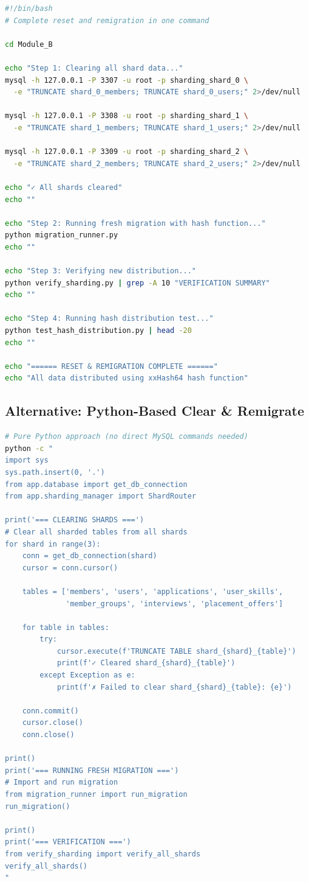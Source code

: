\documentclass[11pt,a4paper]{article}
\begin{document}
\begin{lstlisting}[language=bash]
#!/bin/bash
# Complete reset and remigration in one command

cd Module_B

echo "Step 1: Clearing all shard data..."
mysql -h 127.0.0.1 -P 3307 -u root -p sharding_shard_0 \
  -e "TRUNCATE shard_0_members; TRUNCATE shard_0_users;" 2>/dev/null

mysql -h 127.0.0.1 -P 3308 -u root -p sharding_shard_1 \
  -e "TRUNCATE shard_1_members; TRUNCATE shard_1_users;" 2>/dev/null

mysql -h 127.0.0.1 -P 3309 -u root -p sharding_shard_2 \
  -e "TRUNCATE shard_2_members; TRUNCATE shard_2_users;" 2>/dev/null

echo "✓ All shards cleared"
echo ""

echo "Step 2: Running fresh migration with hash function..."
python migration_runner.py
echo ""

echo "Step 3: Verifying new distribution..."
python verify_sharding.py | grep -A 10 "VERIFICATION SUMMARY"
echo ""

echo "Step 4: Running hash distribution test..."
python test_hash_distribution.py | head -20
echo ""

echo "====== RESET & REMIGRATION COMPLETE ======"
echo "All data distributed using xxHash64 hash function"
\end{lstlisting}

\subsection*{Alternative: Python-Based Clear \& Remigrate}

\begin{lstlisting}[language=bash]
# Pure Python approach (no direct MySQL commands needed)
python -c "
import sys
sys.path.insert(0, '.')
from app.database import get_db_connection
from app.sharding_manager import ShardRouter

print('=== CLEARING SHARDS ===')
# Clear all sharded tables from all shards
for shard in range(3):
    conn = get_db_connection(shard)
    cursor = conn.cursor()
    
    tables = ['members', 'users', 'applications', 'user_skills', 
              'member_groups', 'interviews', 'placement_offers']
    
    for table in tables:
        try:
            cursor.execute(f'TRUNCATE TABLE shard_{shard}_{table}')
            print(f'✓ Cleared shard_{shard}_{table}')
        except Exception as e:
            print(f'✗ Failed to clear shard_{shard}_{table}: {e}')
    
    conn.commit()
    cursor.close()
    conn.close()

print()
print('=== RUNNING FRESH MIGRATION ===')
# Import and run migration
from migration_runner import run_migration
run_migration()

print()
print('=== VERIFICATION ===')
from verify_sharding import verify_all_shards
verify_all_shards()
"
\end{lstlisting}
\end{document}
